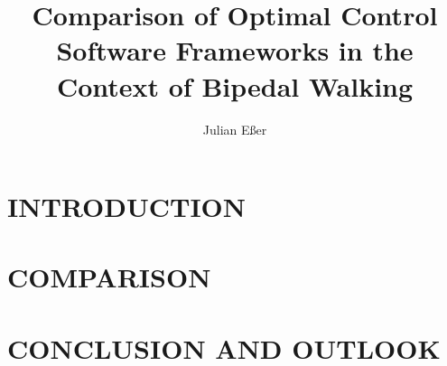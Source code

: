 \documentclass[10pt,english, openany]{book}
\begin{document}

\author{Julian Eßer}
\title{Comparison of Optimal Control Software Frameworks in the Context of Bipedal Walking}

\begin{titlepage}
\maketitle
\end{titlepage}

\tableofcontents{}

\mainmatter
\chapter{INTRODUCTION}





\chapter{COMPARISON}

\chapter{CONCLUSION AND OUTLOOK}

\begin{appendices}

\end{appendices}


\pagebreak



\pagebreak
\end{document}
